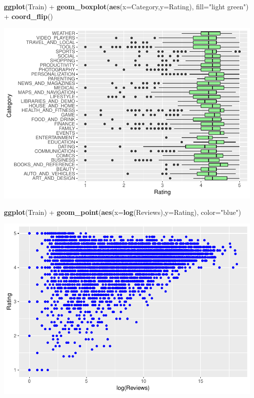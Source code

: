 \documentclass[]{article}
\newenvironment{Shaded}{\begin{snugshade}}{\end{snugshade}}
\newcommand{\KeywordTok}[1]{\textcolor[rgb]{0.13,0.29,0.53}{\textbf{{#1}}}}
\newcommand{\DataTypeTok}[1]{\textcolor[rgb]{0.13,0.29,0.53}{{#1}}}
\newcommand{\StringTok}[1]{\textcolor[rgb]{0.31,0.60,0.02}{{#1}}}
\newcommand{\NormalTok}[1]{{#1}}
\begin{document}
\begin{Shaded}
\begin{Highlighting}[]
\KeywordTok{ggplot}\NormalTok{(Train) +}\StringTok{ }\KeywordTok{geom_boxplot}\NormalTok{(}\KeywordTok{aes}\NormalTok{(}\DataTypeTok{x=}\NormalTok{Category,}\DataTypeTok{y=}\NormalTok{Rating), }\DataTypeTok{fill=}\StringTok{"light green"}\NormalTok{) +}\StringTok{ }\KeywordTok{coord_flip}\NormalTok{()}
\end{Highlighting}
\end{Shaded}

\includegraphics{Project_2_Work_files/figure-latex/unnamed-chunk-16-1.pdf}

\begin{Shaded}
\begin{Highlighting}[]
\KeywordTok{ggplot}\NormalTok{(Train) +}\StringTok{ }\KeywordTok{geom_point}\NormalTok{(}\KeywordTok{aes}\NormalTok{(}\DataTypeTok{x=}\KeywordTok{log}\NormalTok{(Reviews),}\DataTypeTok{y=}\NormalTok{Rating), }\DataTypeTok{color=}\StringTok{"blue"}\NormalTok{)}
\end{Highlighting}
\end{Shaded}

\includegraphics{Project_2_Work_files/figure-latex/unnamed-chunk-16-2.pdf}
\end{document}
